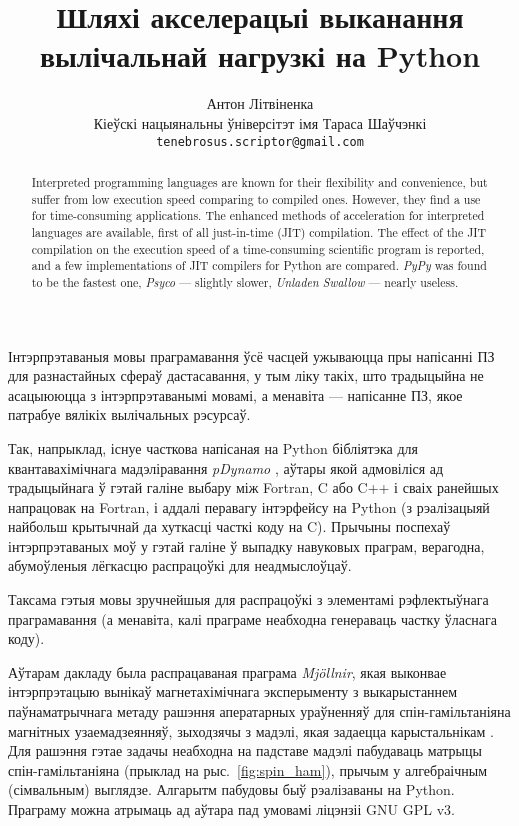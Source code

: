 \documentclass[a4paper,12pt]{article}
\newcommand{\progname}{\textit} %
\begin{document}
\renewcommand{\figurename}{Рыс.} %
\renewcommand{\abstractname}{Анатацыя}
\renewcommand{\refname}{Літаратура}

\title{Шляхі акселерацыі выканання вылічальнай нагрузкі на Python}
\author{Антон Літвіненка\\ \small Кіеўскі нацыянальны ўніверсітэт імя Тараса Шаўчэнкі\\ \small \texttt{tenebrosus.scriptor@gmail.com}}
\date{}
\maketitle

\begin{abstract}
Interpreted programming languages are known for their flexibility and convenience, but suffer from low execution speed comparing to compiled ones. However, they find a use for time-consuming applications. The enhanced methods of acceleration for interpreted languages are available, first of all just-in-time (JIT) compilation. The effect of the JIT compilation on the execution speed of a time-consuming scientific program is reported, and a few implementations of JIT compilers for Python are compared. \progname{PyPy} was found to be the fastest one, \progname{Psyco} --- slightly slower, \progname{Unladen Swallow} --- nearly useless.
\end{abstract}

Інтэрпрэтаваныя мовы праграмавання ўсё часцей ужываюцца пры напісанні ПЗ для разнастайных сфераў дастасавання, у тым ліку такіх, што традыцыйна не асацыююцца з інтэрпрэтаванымі мовамі, а менавіта --- напісанне ПЗ, якое патрабуе вялікіх вылічальных рэсурсаў.

Так, напрыклад, існуе часткова напісаная на Python бібліятэка для квантавахімічнага мадэліравання \progname{pDynamo} \cite{pDynamo}, аўтары якой адмовіліся ад традыцыйнага ў гэтай галіне выбару між Fortran, C або C++ і сваіх ранейшых напрацовак на Fortran, і аддалі перавагу інтэрфейсу на Python (з рэалізацыяй найбольш крытычнай да хуткасці часткі коду на C). Прычыны поспехаў інтэрпрэтаваных моў у гэтай галіне ў выпадку навуковых праграм, верагодна, абумоўленыя лёгкасцю распрацоўкі для неадмыслоўцаў.

Таксама гэтыя мовы зручнейшыя для распрацоўкі з элементамі рэфлектыўнага праграмавання (а менавіта, калі праграме неабходна генераваць частку ўласнага коду).

Аўтарам дакладу была распрацаваная праграма \progname{Mj{\"o}llnir}, якая выконвае інтэрпрэтацыю вынікаў магнетахімічнага эксперыменту з выкарыстаннем паўнаматрычнага метаду рашэння аператарных ураўненняў для спін-гамільтаніяна магнітных узаемадзеянняў, зыходзячы з мадэлі, якая задаецца карыстальнікам \cite{Mjollnir}. Для рашэння гэтае задачы неабходна на падставе мадэлі пабудаваць матрыцы спін-гамільтаніяна (прыклад на рыс.~\ref{fig:spin_ham}), прычым у алгебраічным (сімвальным) выглядзе. Алгарытм пабудовы быў рэалізаваны на Python. Праграму можна атрымаць ад аўтара пад умовамі ліцэнзіі GNU GPL v3.
\end{document}
